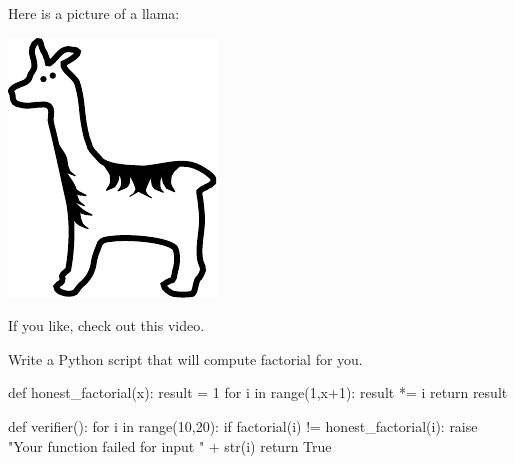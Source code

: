 \documentclass{ximera}
\begin{document}
Here is a picture of a llama:
\begin{image}
\includegraphics{llama.pdf}
\end{image}

If you like, check out this video.




\begin{exploration}
Write a Python script that will compute factorial for you.
\begin{prompt}
\begin{python}
def honest_factorial(x):
  result = 1
  for i in range(1,x+1):
    result *= i
  return result

def verifier():
  for i in range(10,20):
    if factorial(i) != honest_factorial(i):
      raise "Your function failed for input " + str(i)
  return True
\end{python}
\end{prompt}
\end{exploration}
\end{document}
